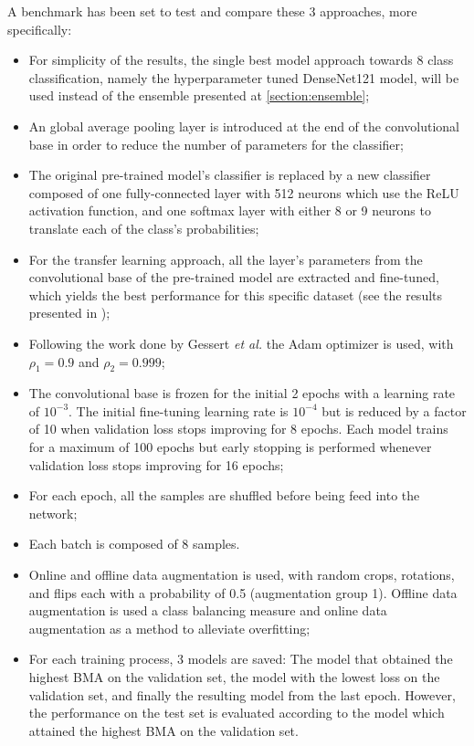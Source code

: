     A benchmark has been set to test and compare these 3 approaches, more specifically:
    \begin{itemize}
        \item For simplicity of the results, the single best model approach towards 8 class classification, namely the hyperparameter tuned DenseNet121 model, will be used instead of the ensemble presented at \cref{section:ensemble};
        \item An global average pooling layer is introduced at the end of the convolutional base in order to reduce the number of parameters for the classifier;
        \item The original pre-trained model's classifier is replaced by a new classifier composed of one fully-connected layer with 512 neurons which use the ReLU activation function, and one softmax layer with either 8 or 9 neurons to translate each of the class's probabilities;
        \item For the transfer learning approach, all the layer's parameters from the convolutional base of the pre-trained model are extracted and fine-tuned, which yields the best performance for this specific dataset (see the results presented in );
        \item Following the work done by Gessert \textit{et al.} \cite{gessert2018} the Adam optimizer \cite{adam} is used, with $\rho_{1} = 0.9$ and $\rho_{2}=0.999$;
        \item The convolutional base is frozen for the initial 2 epochs with a learning rate of $10^{-3}$. The initial fine-tuning learning rate is $10^{-4}$ but is reduced by a factor of 10 when validation loss stops improving for 8 epochs. Each model trains for a maximum of 100 epochs but early stopping is performed whenever validation loss stops improving for 16 epochs;
        \item For each epoch, all the samples are shuffled before being feed into the network;
        \item Each batch is composed of 8 samples.
        \item Online and offline data augmentation is used, with random crops, rotations, and flips each with a probability of 0.5 (augmentation group 1). Offline data augmentation is used a class balancing measure and online data augmentation as a method to alleviate overfitting;
        \item For each training process, 3 models are saved: The model that obtained the highest \ac{BMA} on the validation set, the model with the lowest loss on the validation set, and finally the resulting model from the last epoch. However, the performance on the test set is evaluated according to the model which attained the highest \ac{BMA} on the validation set.
    \end{itemize}
    
